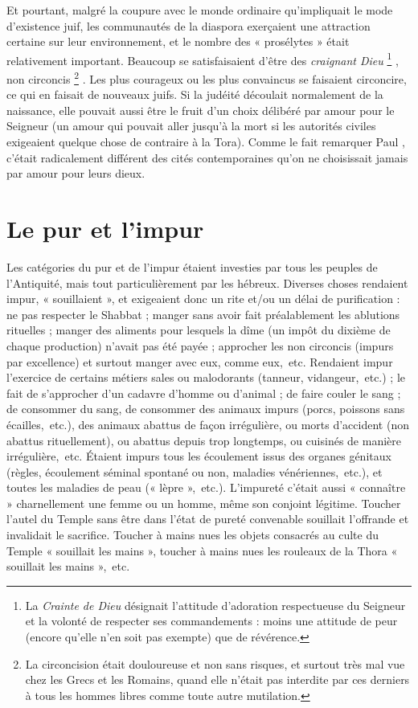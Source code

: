  Et pourtant, malgré la coupure avec le monde ordinaire qu'impliquait le mode d'existence juif, les communautés de la diaspora exerçaient une attraction certaine sur leur environnement, et le nombre des « prosélytes » était relativement important. Beaucoup se satisfaisaient d'être des \emph{craignant Dieu}%
\footnote{La \emph{Crainte de Dieu} désignait l'attitude d'adoration respectueuse du Seigneur et la volonté de respecter ses commandements : moins une attitude de peur (encore qu'elle n'en soit pas exempte) que de révérence.}%
, non circoncis%
\footnote{La circoncision était douloureuse et non sans risques, et surtout très mal vue chez les Grecs et les Romains, quand elle n'était pas interdite par ces derniers à tous les hommes libres comme toute autre mutilation.}%
. Les plus courageux ou les plus convaincus se faisaient circoncire, ce qui en faisait de nouveaux juifs. Si la judéité découlait normalement de la naissance, elle pouvait aussi être le fruit d'un choix délibéré par amour pour le Seigneur (un amour qui pouvait aller jusqu'à la mort si les autorités civiles exigeaient quelque chose de contraire à la Tora). Comme le fait remarquer Paul , c'était radicalement différent des cités contemporaines qu'on ne choisissait jamais par amour pour leurs dieux.





\section{Le pur et l'impur}

 Les catégories du pur et de l'impur étaient investies par tous les peuples de l'Antiquité, mais tout particulièrement par les hébreux. Diverses choses rendaient impur, « souillaient », et exigeaient donc un rite et/ou un délai de purification : ne pas respecter le Shabbat ; manger sans avoir fait préalablement les ablutions rituelles ; manger des aliments pour lesquels la dîme (un impôt du dixième de chaque production) n'avait pas été payée ; approcher les non circoncis (impurs par excellence) et surtout manger avec eux, comme eux,~etc. Rendaient impur l'exercice de certains métiers sales ou malodorants (tanneur, vidangeur,~etc.) ; le fait de s'approcher d'un cadavre d'homme ou d'animal ; de faire couler le sang ; de consommer du sang, de consommer des animaux impurs (porcs, poissons sans écailles,~etc.), des animaux abattus de façon irrégulière, ou morts d'accident (non abattus rituellement), ou abattus depuis trop longtemps, ou cuisinés de manière irrégulière,~etc. Étaient impurs tous les écoulement issus des organes génitaux (règles, écoulement séminal spontané ou non, maladies vénériennes,~etc.), et toutes les maladies de peau (« lèpre »,~etc.). L'impureté c'était aussi « connaître » charnellement une femme ou un homme, même son conjoint légitime. Toucher l'autel du Temple sans être dans l'état de pureté convenable souillait l'offrande et invalidait le sacrifice. Toucher à mains nues les objets consacrés au culte du Temple « souillait les mains », toucher à mains nues les rouleaux de la Thora « souillait les mains »,~etc.

